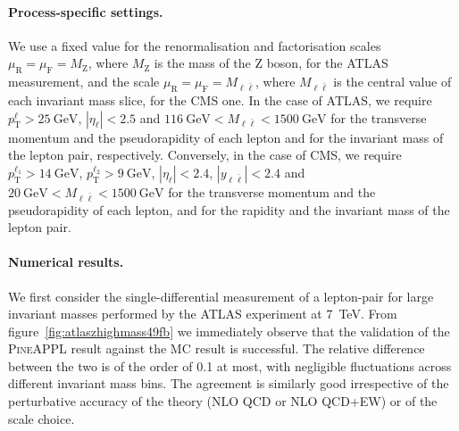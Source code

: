 \paragraph{Process-specific settings.}
We use a fixed value for the renormalisation and factorisation scales $\mu_\mathrm{R}=\mu_\mathrm{F}=M_\mathrm{Z}$, where $M_\mathrm{Z}$ is
the mass of the Z boson, for the ATLAS measurement, and the scale
$\mu_\mathrm{R}=\mu_\mathrm{F}=M_{\ell\bar\ell}$, where $M_{\ell\bar\ell}$ is the central value of each
invariant mass slice, for the CMS one. In the case of ATLAS, we require $p_\mathrm{T}^\ell>\SI{25}{\giga\electronvolt}$,
$|\eta_\ell|<2.5$ and $\SI{116}{\giga\electronvolt}<M_{\ell\bar\ell}<\SI{1500}{\giga\electronvolt}$ for the transverse
momentum and the pseudorapidity of each lepton and for the invariant mass of the
lepton pair, respectively. Conversely, in the case of CMS, we require $p_\mathrm{T}^{\ell_1}>\SI{14}{\giga\electronvolt}$, $p_\mathrm{T}^{\ell_2}>\SI{9}{\giga\electronvolt}$,
$|\eta_\ell|<2.4$, $|y_{\ell\bar\ell}|<2.4$ and $\SI{20}{\giga\electronvolt}<M_{\ell\bar\ell}<\SI{1500}{\giga\electronvolt}$
for the transverse momentum and the pseudorapidity of each lepton, and for the
rapidity and the invariant mass of the lepton pair.

\paragraph{Numerical results.}
We first consider the single-differential measurement of a lepton-pair
for large invariant masses performed by the ATLAS experiment at \SI{7}{\tera\electronvolt}.
From figure~\ref{fig:atlaszhighmass49fb} we immediately
observe that the validation of the \textsc{PineAPPL} result against the MC
result is successful. The relative difference between the two is of the order of
\SI{0.1}{\permille} at most, with negligible fluctuations across different
invariant mass bins. The agreement is similarly good irrespective of the
perturbative accuracy of the theory (NLO QCD or NLO QCD+EW) or of the scale
choice.

